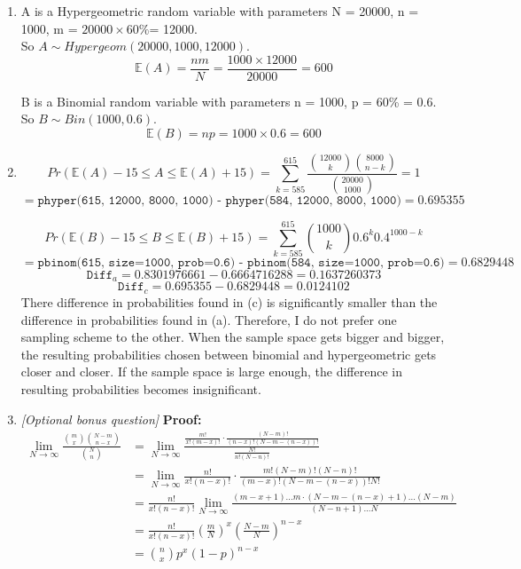 \documentclass[11pt]{article}
\begin{document}
\begin{enumerate}[label=\textbf{Question \arabic*:},start=1]
\begin{enumerate}
  \item A is a Hypergeometric random variable with parameters N = 20000, n = 1000, m = \( 20000 \times 60\% \)= 12000. \\
So \( A \sim Hypergeom(20000, 1000, 12000) \).\\
\[
\mathbb{E}(A) = \frac{ n m }{N} = \frac{1000 \times 12000}{20000} = 600
\]

B is a Binomial random variable with parameters n = 1000, p = 60\% = 0.6.\\
So \( B \sim Bin(1000, 0.6) \). \\
\[
\mathbb{E}(B) = np = 1000 \times 0.6 = 600
\]

  \item 
  
\[
Pr(\mathbb{E}(A) - 15 \leq A \leq \mathbb{E}(A) + 15) = \sum_{k = 585}^{615} \frac{{12000 \choose k} {8000 \choose n-k}}{{20000 \choose 1000}} = 1
\]
\[
= \texttt{phyper(615, 12000, 8000, 1000) - phyper(584, 12000, 8000, 1000)} = 0.695355
\]

\[
Pr(\mathbb{E}(B) - 15 \leq B \leq \mathbb{E}(B) + 15) = \sum_{k = 585}^{615} {1000 \choose k} 0.6^k 0.4^{1000-k}
\]
\[
= \texttt{pbinom(615, size=1000, prob=0.6) - pbinom(584, size=1000, prob=0.6)} = 0.6829448
\]
\[
\texttt{Diff}_a = 0.8301976661 - 0.6664716288 = 0.1637260373
\]
\[
\texttt{Diff}_c = 0.695355 - 0.6829448 = 0.0124102
\]
There difference in probabilities found in (c) is significantly smaller than the difference in probabilities found in (a).
Therefore, I do not prefer one sampling scheme to the other. When the sample space gets bigger and bigger, the resulting probabilities chosen between binomial and hypergeometric gets closer and closer. If the sample space is large enough, the difference in resulting probabilities becomes insignificant.

  \item {\em [Optional bonus question]} 
\textbf{Proof:}\\
\begin{equation}
\begin{split}
\lim_{N\rightarrow\infty} \frac { {m \choose x}{N-m \choose n-x}}{ {N\choose n}} & = \lim_{N\rightarrow\infty} \frac { \frac{m!}{x!(m-x)!} \cdot \frac{(N-m)!}{(n-x)!(N-m-(n-x))!}}{ \frac{N!}{n!(N-n)!} } \\
& = \lim_{N\rightarrow\infty} \frac{n!}{x!(n-x)!} \cdot \frac{m! (N-m)! (N-n)!}{(m-x)! (N-m - (n-x))! N!} \\
& = \frac{n!}{x!(n-x)!}  \lim_{N\rightarrow\infty} \frac{(m-x+1)...m \cdot (N-m-(n-x)+1)...(N-m)}{(N-n+1)...N} \\
& = \frac{n!}{x!(n-x)!}  (\frac{m}{N})^x (\frac{N-m}{N})^{n-x} \\
& = {n \choose x} p^x (1-p)^{n-x}
\end{split}
\end{equation}


\end{enumerate}
\end{enumerate}
\end{document}

